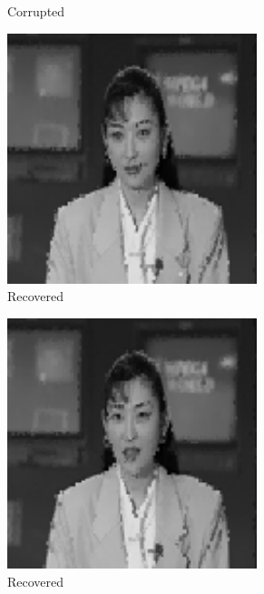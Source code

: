 \begin{figure}[!ht]
\begin{subfigure}{0.4\textwidth}
    \caption{Corrupted}
  \end{subfigure}
  \begin{subfigure}{0.4\textwidth}
    \centering
    \includegraphics[width=0.8\textwidth]{Chapter7/Images/akiyo40_rec_2.png}
    \caption{Recovered}
  \end{subfigure}
  \begin{subfigure}{0.4\textwidth}
    \centering
    \includegraphics[width=0.8\textwidth]{Chapter7/Images/akiyo40_rec_19.png}
    \caption{Recovered}
  \end{subfigure}
  \begin{subfigure}{0.4\textwidth}

\end{subfigure}
\end{figure}
